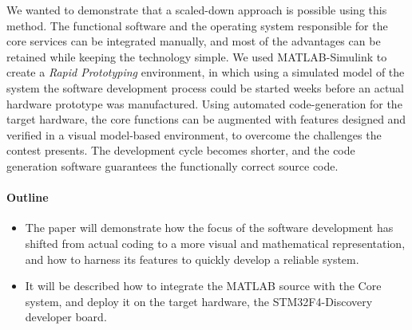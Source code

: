 
We wanted to demonstrate that a scaled-down approach is possible using this method. The functional software and the operating system responsible for the core services can be integrated manually, and most of the advantages can be retained while keeping the technology simple. We used \textsf{MATLAB-Simulink} to create a \emph{Rapid Prototyping} environment, in which using a simulated model of the system the software development process could be started weeks before an actual hardware prototype was manufactured. Using automated code-generation for the target hardware, the core functions can be augmented with features designed and verified in a visual model-based environment, to overcome the challenges the contest presents. The development cycle becomes shorter, and the code generation software guarantees the functionally correct source code.

\paragraph{Outline}
\begin{itemize}
\item The paper will demonstrate how the focus of the software development has shifted from actual coding to a more visual and mathematical representation, and how to harness its features to quickly develop a reliable system.
\item It will be described how to integrate the \textsf{MATLAB} source with the Core system, and deploy it on the target hardware, the \textsf{STM32F4-Discovery} developer board.
\end{itemize}